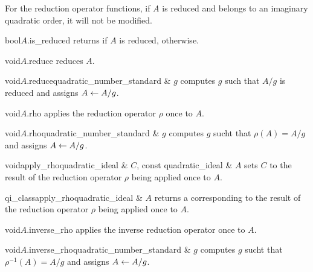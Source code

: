 

For the reduction operator functions, if $A$ is reduced and belongs to an imaginary quadratic
order, it will not be modified.

\begin{cfcode}{bool}{$A$.is_reduced}{}
  returns \TRUE if $A$ is reduced, \FALSE otherwise.
\end{cfcode}

\begin{fcode}{void}{$A$.reduce}{}
  reduces $A$.
\end{fcode}

\begin{fcode}{void}{$A$.reduce}{quadratic_number_standard & $g$}
  computes $g$ such that $A / g$ is reduced and assigns $A \leftarrow A/g$.
\end{fcode}

\begin{fcode}{void}{$A$.rho}{}
  applies the reduction operator $\rho$ once to $A$.
\end{fcode}

\begin{fcode}{void}{$A$.rho}{quadratic_number_standard & $g$}
  computes $g$ sucht that $\rho(A) = A / g$ and assigns $A \leftarrow A / g$.
\end{fcode}

\begin{fcode}{void}{apply_rho}{quadratic_ideal & $C$, const quadratic_ideal & $A$}
  sets $C$ to the result of the reduction operator $\rho$ being applied once to $A$.
\end{fcode}

\begin{fcode}{qi_class}{apply_rho}{quadratic_ideal & $A$}
  returns a  corresponding to the result of the reduction operator $\rho$ being
  applied once to $A$.
\end{fcode}

\begin{fcode}{void}{$A$.inverse_rho}{}
  applies the inverse reduction operator once to $A$.
\end{fcode}

\begin{fcode}{void}{$A$.inverse_rho}{quadratic_number_standard & $g$}
  computes $g$ sucht that $\rho^{-1}(A) = A / g$ and assigns $A \leftarrow A / g$.
\end{fcode}

